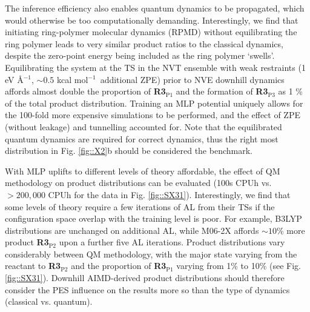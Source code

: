 \documentclass[twoside,twocolumn,9pt]{article}
\newcommand{\kcal}{kcal mol$^{-1}$}
\begin{document}
The inference efficiency also enables quantum dynamics to be propagated, which would otherwise be too computationally demanding. Interestingly, we find that initiating ring-polymer molecular dynamics (RPMD)\cite{Habershon2013} without equilibrating the ring polymer leads to very similar product ratios to the classical dynamics, despite the zero-point energy being included as the ring polymer `swells’. Equilibrating the system at the TS in the NVT ensemble with weak restraints (1 eV \AA$^{-1}$, $\sim0.5$ \kcal~additional ZPE) prior to NVE downhill dynamics affords almost double the proportion of {\bfseries{R3$_\text{P1}$}} and the formation of {\bfseries{R3$_\text{P3}$}} as 1 \% of the total product distribution. Training an MLP potential uniquely allows for the 100-fold more expensive simulations to be performed, and the effect of ZPE (without leakage\cite{Lee2018}) and tunnelling accounted for. Note that the equilibrated quantum dynamics are required for correct dynamics\cite{Liu2019}, thus the right most distribution in Fig. \ref{fig::X2}b should be considered the benchmark.


With MLP uplifts to different levels of theory affordable, the effect of QM methodology on product distributions can be evaluated (100s CPUh vs. $>200,000$ CPUh for the data in Fig. \ref{fig::SX31}).  Interestingly, we find that some levels of theory require a few iterations of AL from their TSs if the configuration space overlap with the training level is poor. For example, B3LYP distributions are unchanged on additional AL, while M06-2X affords $\sim10$\% more product {\bfseries{R3$_\text{P2}$}} upon a further five AL iterations. Product distributions vary considerably between QM methodology, with the major state varying from the reactant to {\bfseries{R3$_\text{P2}$}} and the proportion of {\bfseries{R3$_\text{P1}$}} varying from 1\% to 10\% (see Fig. \ref{fig::SX31}). Downhill AIMD-derived product distributions should therefore consider the PES influence on the results more so than the type of dynamics (classical vs. quantum).
\end{document}

